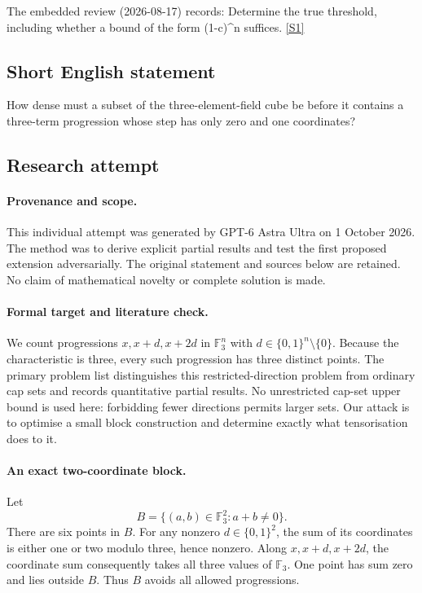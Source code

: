\documentclass[11pt,a4paper]{article}
\newcommand{\F}{\mathbb{F}}
\newcommand{\sref}[2]{\hyperlink{source:#1:#2}{[S#2]}}
\begin{document}
The embedded review (2026-08-17) records: Determine the true threshold, including whether a bound of the form (1-c)\textasciicircum{}n suffices. \sref{statement}{1}

\subsection{Short English statement}

How dense must a subset of the three-element-field cube be before it contains a three-term progression whose step has only zero and one coordinates?

\subsection{Research attempt}

\paragraph{Provenance and scope.}
This individual attempt was generated by GPT-6 Astra Ultra on 1 October 2026. The method was to derive explicit partial results and test the first proposed extension adversarially. The original statement and sources below are retained. No claim of mathematical novelty or complete solution is made.

\paragraph{Formal target and literature check.}
We count progressions $x,x+d,x+2d$ in $\F_3^n$ with $d\in\{0,1\}^n\setminus\{0\}$. Because the characteristic is three, every such progression has three distinct points. The primary problem list distinguishes this restricted-direction problem from ordinary cap sets and records quantitative partial results. No unrestricted cap-set upper bound is used here: forbidding fewer directions permits larger sets. Our attack is to optimise a small block construction and determine exactly what tensorisation does to it.

\paragraph{An exact two-coordinate block.}
Let
\[
 B=\{(a,b)\in\F_3^2:a+b\ne0\}.
\]
There are six points in $B$. For any nonzero $d\in\{0,1\}^2$, the sum of its coordinates is either one or two modulo three, hence nonzero. Along $x,x+d,x+2d$, the coordinate sum consequently takes all three values of $\F_3$. One point has sum zero and lies outside $B$. Thus $B$ avoids all allowed progressions.
\end{document}
